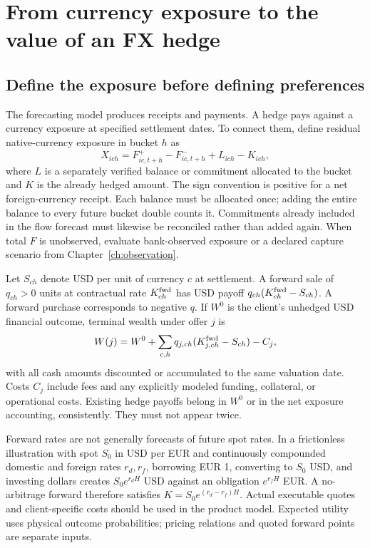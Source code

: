 \chapter{From currency exposure to the value of an FX hedge}
\label{ch:utility}
\section{Define the exposure before defining preferences}
The forecasting model produces receipts and payments. A hedge pays against a currency exposure at specified settlement dates. To connect them, define residual native-currency exposure in bucket $h$ as
\begin{equation}
X_{ich}=F^+_{ic,t+h}-F^-_{ic,t+h}+L_{ich}-K_{ich},
\end{equation}
where $L$ is a separately verified balance or commitment allocated to the bucket and $K$ is the already hedged amount. The sign convention is positive for a net foreign-currency receipt. Each balance must be allocated once; adding the entire balance to every future bucket double counts it. Commitments already included in the flow forecast must likewise be reconciled rather than added again. When total $F$ is unobserved, evaluate bank-observed exposure or a declared capture scenario from Chapter~\ref{ch:observation}.

Let $S_{ch}$ denote USD per unit of currency $c$ at settlement. A forward sale of $q_{ch}>0$ units at contractual rate $K^{\rm fwd}_{ch}$ has USD payoff $q_{ch}(K^{\rm fwd}_{ch}-S_{ch})$. A forward purchase corresponds to negative $q$. If $W^0$ is the client's unhedged USD financial outcome, terminal wealth under offer $j$ is
\begin{equation}
W(j)=W^0+\sum_{c,h}q_{j,ch}(K^{\rm fwd}_{j,ch}-S_{ch})-C_j,
\label{eq:wealth}
\end{equation}
with all cash amounts discounted or accumulated to the same valuation date. Costs $C_j$ include fees and any explicitly modeled funding, collateral, or operational costs. Existing hedge payoffs belong in $W^0$ or in the net exposure accounting, consistently. They must not appear twice.

Forward rates are not generally forecasts of future spot rates. In a frictionless illustration with spot $S_0$ in USD per EUR and continuously compounded domestic and foreign rates $r_d,r_f$, borrowing EUR 1, converting to $S_0$ USD, and investing dollars creates $S_0e^{r_dH}$ USD against an obligation $e^{r_fH}$ EUR. A no-arbitrage forward therefore satisfies $K=S_0e^{(r_d-r_f)H}$. Actual executable quotes and client-specific costs should be used in the product model. Expected utility uses physical outcome probabilities; pricing relations and quoted forward points are separate inputs.

